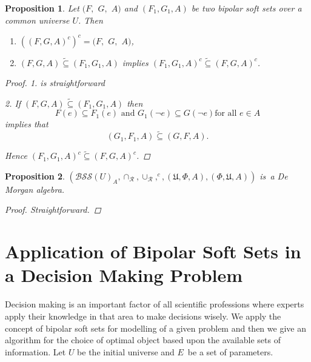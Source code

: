 \documentclass{amsart}
\theoremstyle{plain}
\newtheorem{proposition}{Proposition}
\numberwithin{equation}{section}
\begin{document}
\begin{proposition}
Let $(F,$ $G,$ $A)$ and $(F_{1},G_{1},A)$ be two \textit{bipolar soft set}s
over a common universe $U$. Then

\begin{enumerate}
\item $((F,G,A)^{c})^{c}=(F,$ $G,$ $A)$,

\item $(F,G,A)\tilde{\subseteq}(F_{1},G_{1},A)$ implies $(F_{1},G_{1},A)^{c}\tilde{\subseteq}(F,G,A)^{c}$.
\end{enumerate}

\begin{proof}
1. is straightforward

2. If $(F,G,A)\tilde{\subseteq}(F_{1},G_{1},A)$ then\begin{equation*}
F(e)\subseteq F_{1}(e)\text{ and }G_{1}(\lnot e)\subseteq G(\lnot e)\text{
for all }e\in A
\end{equation*}implies that\begin{equation*}
(G_{1},F_{1},A)\tilde{\subseteq}(G,F,A)\text{.}
\end{equation*}

Hence $(F_{1},G_{1},A)^{c}\tilde{\subseteq}(F,G,A)^{c}$.
\end{proof}
\end{proposition}

\begin{proposition}
$(\mathcal{BSS}(U)_{A},\cap _{\mathcal{R}},\cup _{\mathcal{R}},^{c},(\mathfrak{U},\Phi ,A),(\Phi ,\mathfrak{U},A))$ is\ a De Morgan algebra.

\begin{proof}
Straightforward.
\end{proof}
\end{proposition}

\section{Application of Bipolar Soft Sets in a Decision Making Problem}

Decision making is an important factor of all scientific professions where
experts apply their knowledge in that area to make decisions wisely. We
apply the concept of bipolar soft sets for modelling of a given problem and
then we give an algorithm for the choice of optimal object based upon the
available sets of information. Let $U$ be the initial universe and $E$\ be a
set of parameters.
\end{document}
